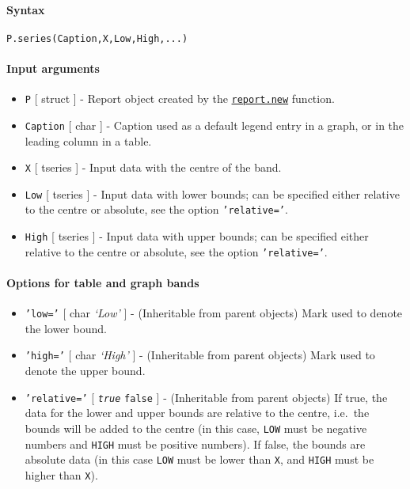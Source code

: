 


	\paragraph{Syntax}\label{syntax}

\begin{verbatim}
P.series(Caption,X,Low,High,...)
\end{verbatim}

\paragraph{Input arguments}\label{input-arguments}

\begin{itemize}
\item
  \texttt{P} {[} struct {]} - Report object created by the
  \href{report/new}{\texttt{report.new}} function.
\item
  \texttt{Caption} {[} char {]} - Caption used as a default legend entry
  in a graph, or in the leading column in a table.
\item
  \texttt{X} {[} tseries {]} - Input data with the centre of the band.
\item
  \texttt{Low} {[} tseries {]} - Input data with lower bounds; can be
  specified either relative to the centre or absolute, see the option
  \texttt{'relative='}.
\item
  \texttt{High} {[} tseries {]} - Input data with upper bounds; can be
  specified either relative to the centre or absolute, see the option
  \texttt{'relative='}.
\end{itemize}

\paragraph{Options for table and graph
bands}\label{options-for-table-and-graph-bands}

\begin{itemize}
\item
  \texttt{'low='} {[} char \textbar{} \emph{`Low'} {]} - (Inheritable
  from parent objects) Mark used to denote the lower bound.
\item
  \texttt{'high='} {[} char \textbar{} \emph{`High'} {]} - (Inheritable
  from parent objects) Mark used to denote the upper bound.
\item
  \texttt{'relative='} {[} \emph{\texttt{true}} \textbar{}
  \texttt{false} {]} - (Inheritable from parent objects) If true, the
  data for the lower and upper bounds are relative to the centre,
  i.e.~the bounds will be added to the centre (in this case,
  \texttt{LOW} must be negative numbers and \texttt{HIGH} must be
  positive numbers). If false, the bounds are absolute data (in this
  case \texttt{LOW} must be lower than \texttt{X}, and \texttt{HIGH}
  must be higher than \texttt{X}).
\end{itemize}

